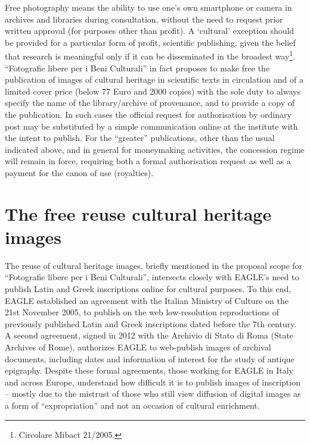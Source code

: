 \documentclass[amsthm,ebook]{saparticle}
\begin{document}
Free photography means the ability to use one’s own smartphone or camera in archives and libraries during consultation,
without the need to request prior written approval (for purposes other than profit). A `cultural’ exception should be
provided for a particular form of profit, scientific publishing, given the belief that research is meaningful only if
it can be disseminated in the broadest way\footnote{Circolare Mibact 21/2005.}. ``Fotografie libere per i Beni
Culturali'' in fact proposes to make free the publication of images of cultural heritage in scientific texts in
circulation and of a limited cover price (below 77 Euro and 2000 copies) with the sole duty to always specify the name
of the library/archive of provenance, and to provide a copy of the publication. In such cases the official request for
authorisation by ordinary post may be substituted by a simple communication online at the institute with the intent to
publish. For the ``greater'' publications, other than the usual indicated above, and in general for moneymaking
activities, the concession regime will remain in force, requiring both a formal authorisation request as well as a
payment for the canon of use (royalties).






\section{The free reuse cultural heritage images}




The reuse of cultural heritage images, briefly mentioned in the proposal scope for ``Fotografie libere per i Beni
Culturali'', intersects closely with EAGLE’s need to publish Latin and Greek inscriptions online for cultural purposes.
To this end, EAGLE established an agreement with the Italian Ministry of Culture on the 21st November 2005, to publish
on the web low-resolution reproductions of previously published Latin and Greek inscriptions dated before the 7th
century. A second agreement, signed in 2012 with the Archivio di Stato di Roma (State Archives of Rome), authorizes
EAGLE to web-publish images of archival documents, including dates and information of interest for the study of antique
epigraphy. Despite these formal agreements, those working for EAGLE in Italy and across Europe, understand how
difficult it is to publish images of inscription – mostly due to the mistrust of those who still view diffusion of
digital images as a form of ``expropriation'' and not an occasion of cultural enrichment.
\end{document}
